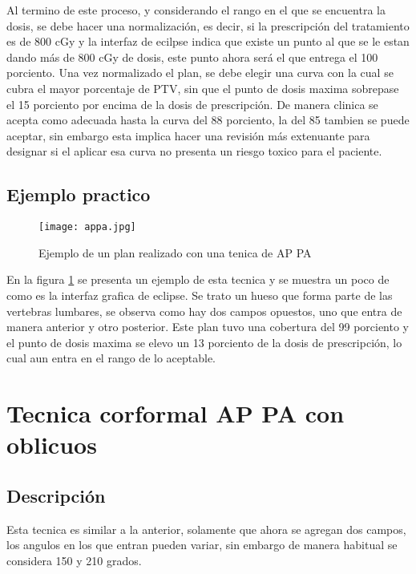 \documentclass{article}
\begin{document}
Al termino de este proceso, y considerando el rango en el que se encuentra la dosis, se debe hacer una normalización, es decir, si la prescripción del tratamiento es de 800 cGy y la interfaz de ecilpse indica que existe un punto al que se le estan dando más de 800 cGy de dosis, este punto ahora será el que entrega el 100 porciento. Una vez normalizado el plan, se debe elegir una curva con la cual se cubra el mayor porcentaje de PTV, sin que el punto de dosis maxima sobrepase el 15 porciento por encima de la dosis de prescripción. De manera clinica se acepta como adecuada hasta la curva del 88 porciento, la del 85 tambien se puede aceptar, sin embargo esta implica hacer una revisión más extenuante para designar si el aplicar esa curva no presenta un riesgo toxico para el paciente. 

\subsection{Ejemplo practico}

\begin{figure}[h!]
    \centering
    \texttt{[image: appa.jpg]}
    \caption{Ejemplo de un plan realizado con una tenica de AP PA}
    \label{a1}
\end{figure}





En la figura \ref{a1} se presenta un ejemplo de esta tecnica y se muestra un poco de como es la interfaz grafica de eclipse. Se trato un hueso que forma parte de las vertebras lumbares, se observa como hay dos campos opuestos, uno que entra de manera anterior y otro posterior. Este plan tuvo una cobertura del 99 porciento y el punto de dosis maxima se elevo un 13 porciento de la dosis de prescripción, lo cual aun entra en el rango de lo aceptable.

\section{Tecnica corformal AP PA con oblicuos}


\subsection{Descripción}

Esta tecnica es similar a la anterior, solamente que ahora se agregan dos campos, los angulos en los que entran pueden variar, sin embargo de manera habitual se considera 150 y 210 grados. 
\end{document}
